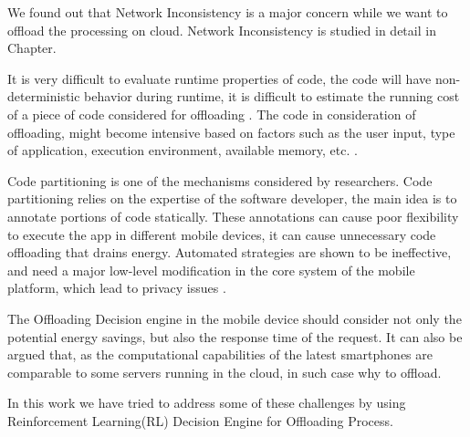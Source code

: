 \documentclass{report}
\begin{document}
We found out that Network Inconsistency is a major concern while we want to offload the processing on cloud. Network Inconsistency is studied in detail in Chapter.

It is very difficult to evaluate runtime properties of code, the code will have non-deterministic behavior during runtime, it is difficult to estimate the running cost of a piece of code considered for offloading \cite{flores2015mobile}. The code in consideration of offloading, might become intensive based on factors such as the user input, type of application, execution environment, available memory, etc. \cite{flores2013mobile}.

Code partitioning is one of the mechanisms considered by researchers. Code partitioning relies on the expertise of the software developer, the main idea is to annotate portions of code statically. These annotations can cause poor flexibility to execute the app in different mobile devices, it can cause unnecessary code offloading that drains energy. Automated strategies are shown to be ineffective, and need a major low-level modification in the core system of the mobile platform, which lead to privacy issues \cite{flores2015mobile}.

The Offloading Decision engine in the mobile device should consider not only the potential energy savings, but also the response time of the request. It can also be argued that, as the computational capabilities of the latest smartphones are comparable to some servers running in the cloud, in such case why to offload.

In this work we have tried to address some of these challenges by using Reinforcement Learning(RL) Decision Engine for Offloading Process.
\end{document}
